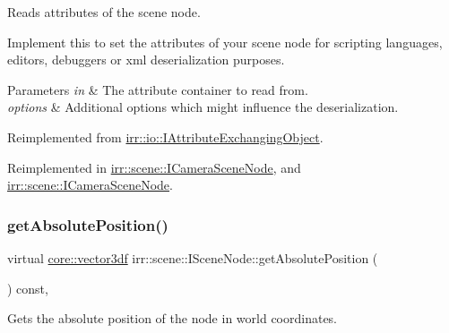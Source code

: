Reads attributes of the scene node. 

Implement this to set the attributes of your scene node for scripting languages, editors, debuggers or xml deserialization purposes. 
\begin{DoxyParams}{Parameters}
{\em in} & The attribute container to read from. \\
\hline
{\em options} & Additional options which might influence the deserialization. \\
\hline
\end{DoxyParams}


Reimplemented from \hyperlink{classirr_1_1io_1_1IAttributeExchangingObject_a013d4ead3736d7fab4bc18c2d61a3e2e}{irr\+::io\+::\+I\+Attribute\+Exchanging\+Object}.



Reimplemented in \hyperlink{classirr_1_1scene_1_1ICameraSceneNode_a0df881cb5e2a55562399281061151ae8}{irr\+::scene\+::\+I\+Camera\+Scene\+Node}, and \hyperlink{classirr_1_1scene_1_1ICameraSceneNode_a0df881cb5e2a55562399281061151ae8}{irr\+::scene\+::\+I\+Camera\+Scene\+Node}.

\mbox{\label{classirr_1_1scene_1_1ISceneNode_a09a1c2ce3cf5448197a0c7b0bb16a516}} 
\subsubsection{\texorpdfstring{get\+Absolute\+Position()}{getAbsolutePosition()}\hspace{0.1cm}{\footnotesize\ttfamily [1/2]}}
{\footnotesize\ttfamily virtual \hyperlink{namespaceirr_1_1core_ae6e2b2a6c552833ebbd5b7463d03586b}{core\+::vector3df} irr\+::scene\+::\+I\+Scene\+Node\+::get\+Absolute\+Position (\begin{DoxyParamCaption}{ }\end{DoxyParamCaption}) const\hspace{0.3cm}{\ttfamily [inline]}, {\ttfamily [virtual]}}



Gets the absolute position of the node in world coordinates. 

